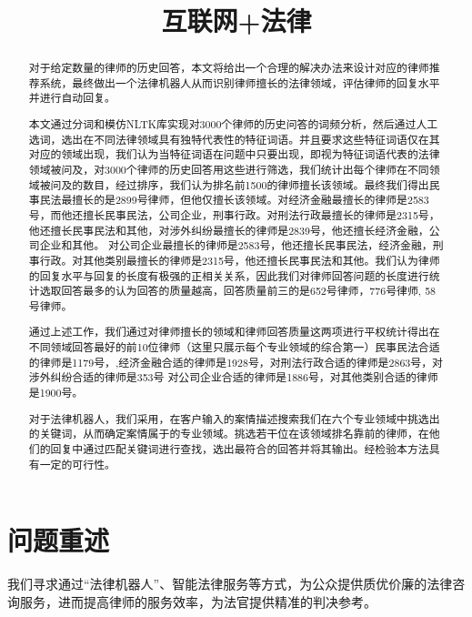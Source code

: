 \documentclass[bwprint]{cumcmthesis}
\title{互联网+法律}
\begin{document}
 \maketitle

 \begin{abstract}
对于给定数量的律师的历史回答，本⽂将给出⼀个合理的解决办法来设计对应的律师推荐系统，最终做出⼀个法律机器⼈从而识别律师擅长的法律领域，评估律师的回复⽔平并进行自动回复。

本文通过分词和模仿NLTK库实现对3000个律师的历史问答的词频分析，然后通过人工选词，选出在不同法律领域具有独特代表性的特征词语。并且要求这些特征词语仅在其对应的领域出现，我们认为当特征词语在问题中只要出现，即视为特征词语代表的法律领域被问及，对3000个律师的历史回答用这些进行筛选，我们统计出每个律师在不同领域被问及的数目，经过排序，我们认为排名前1500的律师擅长该领域。最终我们得出民事民法最擅长的是2899号律师，但他仅擅长该领域。对经济金融最擅长的律师是2583号，而他还擅长民事民法，公司企业，刑事行政。对刑法行政最擅长的律师是2315号，他还擅长民事民法和其他，对涉外纠纷最擅长的律师是2839号，他还擅长经济金融，公司企业和其他。 对公司企业最擅长的律师是2583号，他还擅长民事民法，经济金融，刑事行政。对其他类别最擅长的律师是2315号，他还擅长民事民法和其他。我们认为律师的回复水平与回复的长度有极强的正相关关系，因此我们对律师回答问题的长度进行统计选取回答最多的认为回答的质量越高，回答质量前三的是652号律师，776号律师, 58号律师。

通过上述工作，我们通过对律师擅长的领域和律师回答质量这两项进行平权统计得出在不同领域回答最好的前10位律师（这里只展示每个专业领域的综合第一）民事民法合适的律师是1179号，,经济金融合适的律师是1928号，对刑法行政合适的律师是2863号，对涉外纠纷合适的律师是353号 对公司企业合适的律师是1886号，对其他类别合适的律师是1900号。

对于法律机器人，我们采用，在客户输入的案情描述搜索我们在六个专业领域中挑选出的关键词，从而确定案情属于的专业领域。挑选若干位在该领域排名靠前的律师，在他们的回复中通过匹配关键词进行查找，选出最符合的回答并将其输出。经检验本方法具有一定的可行性。

 

\end{abstract}

 \tableofcontents
 \newpage

\section{问题重述}

我们寻求通过“法律机器人”、智能法律服务等方式，为公众提供质优价廉的法律咨询服务，进而提高律师的服务效率，为法官提供精准的判决参考。
\end{document}
